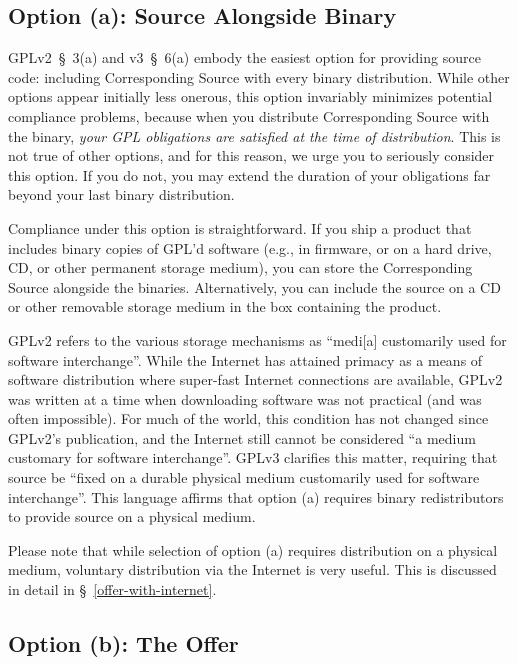 \subsection{Option (a): Source Alongside Binary}

GPLv2~\S~3(a) and v3~\S~6(a) embody the easiest option for providing
source code: including Corresponding Source with every binary
distribution.  While other options appear initially less onerous, this
option invariably minimizes potential compliance problems, because when
you distribute Corresponding Source with the binary, \emph{your GPL
  obligations are satisfied at the time of distribution}.  This is not
true of other options, and for this reason, we urge you to seriously
consider this option.  If you do not, you may extend the duration of your
obligations far beyond your last binary distribution.

Compliance under this option is straightforward.  If you ship a product
that includes binary copies of GPL'd software (e.g., in firmware, or on a
hard drive, CD, or other permanent storage medium), you can store the
Corresponding Source alongside the binaries.  Alternatively, you can
include the source on a CD or other removable storage medium in the box
containing the product.

GPLv2 refers to the various storage mechanisms as ``medi[a] customarily
used for software interchange''.  While the Internet has attained primacy
as a means of software distribution where super-fast Internet connections
are available, GPLv2 was written at a time when downloading software was
not practical (and was often impossible).  For much of the world, this
condition has not changed since GPLv2's publication, and the Internet
still cannot be considered ``a medium customary for software
interchange''.  GPLv3 clarifies this matter, requiring that source be
``fixed on a durable physical medium customarily used for software
interchange''.  This language affirms that option (a) requires binary
redistributors to provide source on a physical medium.

Please note that while selection of option (a) requires distribution on a
physical medium, voluntary distribution via the Internet is very useful.  This
is discussed in detail in \S~\ref{offer-with-internet}.

\subsection{Option (b): The Offer}
\label{offer-for-source}

